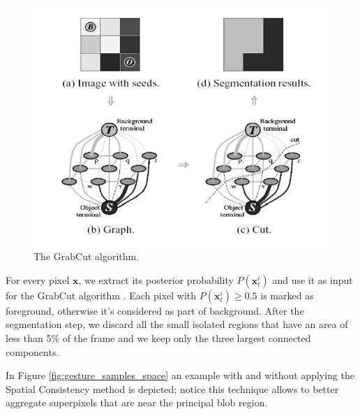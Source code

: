 \begin{figure}[htbp]
	\centering
		\includegraphics[width=.75\linewidth]{Figures/grabcut.jpg}
	\caption{The GrabCut algorithm.}
	\label{fig:GrabCut}
\end{figure}
 

For every pixel $\mathbf{x}$, we extract its posterior probability $P(\mathbf{x}_{t}^{i})$ and use it as input for the GrabCut algorithm \cite{rother04}. Each pixel with $P(\mathbf{x}_{t}^{i}) \geq 0.5$ is marked as foreground, otherwise it's considered as part of background. After the segmentation step, we discard all the small isolated regions that have an area of less than 5\% of the frame and we keep only the three largest connected components.

In Figure \ref{fig:gesture_samples_space} an example with and without applying the Spatial Consistency method is depicted; notice this technique allows to better aggregate superpixels that are near the principal blob region.


